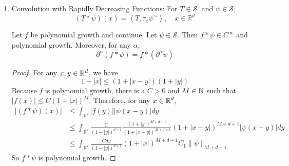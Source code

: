 \begin{enumerate}
	\item Convolution with Rapidly Decreasing Functions: For $T \in \mathcal{S}^\prime$ and $\psi \in \mathcal{S}$,
	\begin{equation*}
		(T * \psi)(x)=\left\langle T, \tau_x \psi^{\sim}\right\rangle, \quad x \in \mathbb{R}^d
	\end{equation*}

	\begin{lem}
		Let $f$ be polynomial growth and continue. Let $\psi \in \mathcal{S}$. Then $f * \psi \in C^\infty$ and polynomial growth. Moreover, for any $\alpha$, 
		\begin{equation*}
			\partial^\alpha(f * \psi)=f *\left(\partial^\alpha \psi\right)
		\end{equation*}
	\end{lem}
	\begin{proof}
		For any $x,y \in \mathbb{R}^d$, we have
		\begin{equation*}
			1+|x| \leq(1+|x-y|)(1+|y|)
		\end{equation*}
		Because $f$ is polynomial growth, there is a $C> 0$ and $M \in \mathbb{N}$ such that $|f(x)| \leq C(1+|x|)^M$. Therefore, for any $x \in \mathbb{R}^d$,
		\begin{equation*}
			\begin{aligned}
				|(f * \psi)(x)| &\leq \int_{\mathbb{R}^d}|f(y)||\psi(x-y)| d y \\
				&\leq \int_{\mathbb{R}^d} \frac{C}{(1+|y|)^{d+1}} \frac{(1+|y|)^{M+d+1}}{(1+|x-y|)^{M+d+1}}(1+|x-y|)^{M+d+1}|\psi(x-y)| d y \\
				&\leq \int_{\mathbb{R}^d} \frac{C d y}{(1+|y|)^{d+1}}(1+|x|)^{M+d+1} C_1\|\psi\|_{M+d+1}
			\end{aligned}
		\end{equation*}
		So $f * \psi$ is polynomial growth.


\end{proof}
\end{enumerate}
